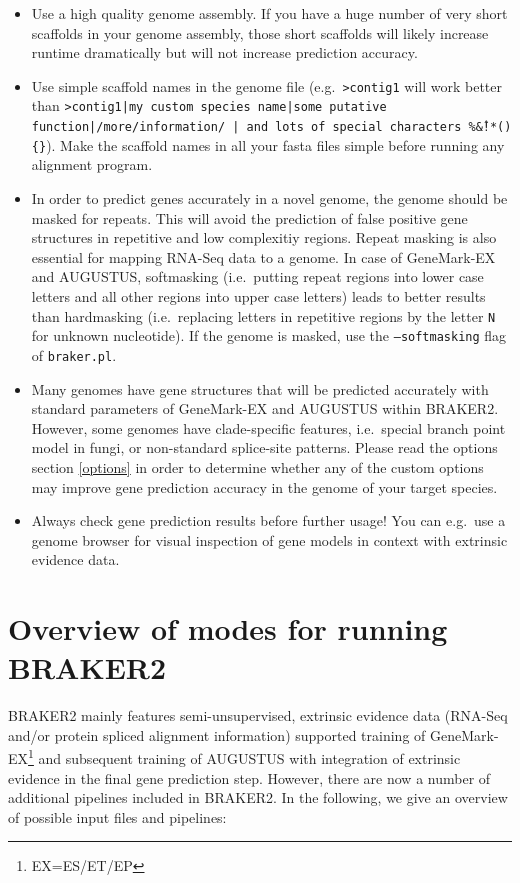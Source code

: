 \documentclass[a4paper,10pt]{report}
\begin{document}
\begin{itemize}
 \item Use a high quality genome assembly. If you have a huge number of very short scaffolds in your genome assembly, those short scaffolds will likely increase runtime dramatically but will not increase prediction accuracy. 
 \item Use simple scaffold names in the genome file (e.g.~\texttt{>contig1} will work better than \texttt{>contig1|my custom species name|some putative function|/more/information/ | and lots of special characters \%\^\&!*()\{\}}). Make the scaffold names in all your fasta files simple before running any alignment program.
 \item In order to predict genes accurately in a novel genome, the genome should be masked for repeats. This will avoid the prediction of false positive gene structures in repetitive and low complexitiy regions. Repeat masking is also essential for mapping RNA-Seq data to a genome. In case of GeneMark-EX and AUGUSTUS, softmasking (i.e.~putting repeat regions into lower case letters and all other regions into upper case letters) leads to better results than hardmasking (i.e.~replacing letters in repetitive regions by the letter \texttt{N} for unknown nucleotide). If the genome is masked, use the \texttt{--softmasking} flag of \texttt{braker.pl}.
 
 \item Many genomes have gene structures that will be predicted accurately with standard parameters of GeneMark-EX and AUGUSTUS within BRAKER2. However, some genomes have clade-specific features, i.e.~special branch point model in fungi, or non-standard splice-site patterns. Please read the options section \ref{options} in order to determine whether any of the custom options may improve gene prediction accuracy in the genome of your target species.
 
 \item Always check gene prediction results before further usage! You can e.g.~use a genome browser for visual inspection of gene models in context with extrinsic evidence data.
\end{itemize}

\section{Overview of modes for running BRAKER2}

BRAKER2 mainly features semi-unsupervised, extrinsic evidence data (RNA-Seq and/or protein spliced alignment information) supported training of GeneMark-EX\footnote{EX=ES/ET/EP} and subsequent training of AUGUSTUS with integration of extrinsic evidence in the final gene prediction step. However, there are now a number of additional pipelines included in BRAKER2. In the following, we give an overview of possible input files and pipelines:
\end{document}
